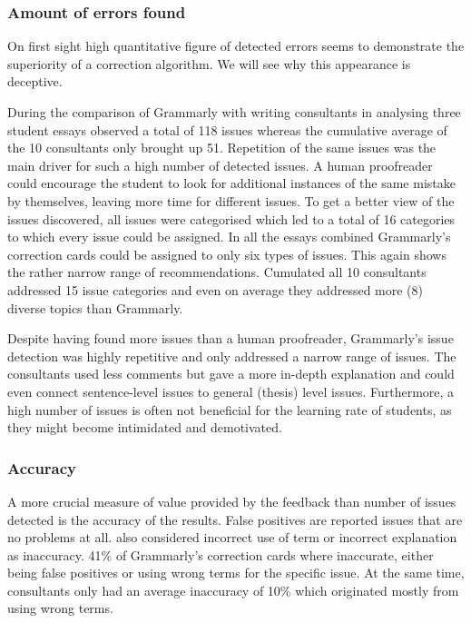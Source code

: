 \documentclass[runningheads]{llncs}
\let\OldTextregistered\textregistered
\renewcommand{\textregistered}{\OldTextregistered\xspace}%
\begin{document}
\subsubsection{Amount of errors found}
On first sight high quantitative figure of detected errors seems to demonstrate the superiority of a correction algorithm. We will see why this appearance is deceptive.

During the comparison of Grammarly\textregistered with writing consultants in analysing three student essays \textcite{dembsey_closing_2017} observed a total of 118 issues whereas the cumulative average of the 10 consultants only brought up 51. Repetition of the same issues was the main driver for such a high number of detected issues. A human proofreader could encourage the student to look for additional instances of the same mistake by themselves, leaving more time for different issues. To get a better view of the issues discovered, all issues were categorised which led to a total of 16 categories to which every issue could be assigned. In all the essays combined Grammarly\textregistered's correction cards could be assigned to only six types of issues. This again shows the rather narrow range of recommendations. Cumulated all 10 consultants addressed 15 issue categories and even on average they addressed more (8) diverse topics than Grammarly\textregistered.

Despite having found more issues than a human proofreader, Grammarly\textregistered's issue detection was highly repetitive and only addressed a narrow range of issues. The consultants used less comments but gave a more in-depth explanation and could even connect sentence-level issues to general (thesis) level issues. Furthermore, a high number of issues is often not beneficial for the learning rate of students, as they might become intimidated and demotivated. 
\citep{dembsey_closing_2017}


\subsubsection{Accuracy}
A more crucial measure of value provided by the feedback than number of issues detected is the accuracy of the results. False positives are reported issues that are no problems at all. \textcite{dembsey_closing_2017} also considered incorrect use of term or incorrect explanation as inaccuracy. 41\% of Grammarly\textregistered's correction cards where inaccurate, either being false positives or using wrong terms for the specific issue. At the same time, consultants only had an average inaccuracy of 10\% which originated mostly from using wrong terms.
\citep{dembsey_closing_2017}
\end{document}
